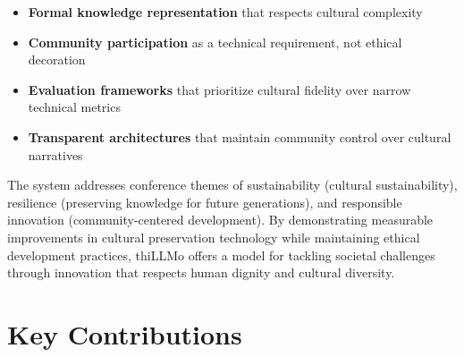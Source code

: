 \documentclass[11pt,a4paper]{article}
\begin{document}
\begin{itemize}
    \item \textbf{Formal knowledge representation} that respects cultural complexity
    \item \textbf{Community participation} as a technical requirement, not ethical decoration
    \item \textbf{Evaluation frameworks} that prioritize cultural fidelity over narrow technical metrics
    \item \textbf{Transparent architectures} that maintain community control over cultural narratives
\end{itemize}

The system addresses conference themes of sustainability (cultural sustainability), resilience (preserving knowledge for future generations), and responsible innovation (community-centered development). By demonstrating measurable improvements in cultural preservation technology while maintaining ethical development practices, thiLLMo offers a model for tackling societal challenges through innovation that respects human dignity and cultural diversity.

\newpage

\section*{Key Contributions}
\end{document}
